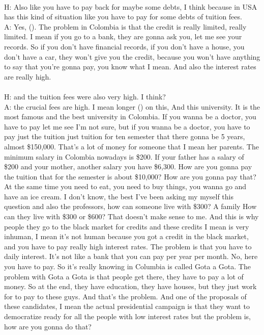 \documentclass{phyasgn}\usepackage{nag}
\begin{document}
\\
H: Also like you have to pay back for maybe some debts, I think because in USA has this kind of situation like you have to pay for some debts of tuition fees.\\
A: Yes, (). The problem in Colombia is that the credit is really limited, really limited. I mean if you go to a bank, they are gonna ask you, let me see your records. So if you don't have financial records, if you don't have a house, you don't have a car, they won't give you the credit, because you won't have anything to say that you're gonna pay, you know what I mean. And also the interest rates are really high.\\
\\
H: and the tuition fees were also very high. I think?\\
A: the crucial fees are high. I mean longer () on this, And this university. It is the most famous and the best university in Colombia. If you wanna be a doctor, you have to pay let me see I'm not sure, but if you wanna be a doctor, you have to pay just the tuition just tuition for ten semester that there gonna be 5 years, almost \$150,000. That's a lot of money for someone that I mean her parents. The minimum salary in Colombia nowadays is \$200. If your father has a salary of \$200 and your mother, another salary you have \$6,300. How are you gonna pay the tuition that for the semester is about \$10,000? How are you gonna pay that? At the same time you need to eat, you need to buy things, you wanna go and have an ice cream. I don't know, the best I've been asking my myself this question and also the professors, how can someone live with \$300? A family How can they live with \$300 or \$600? That doesn't make sense to me. And this is why people they go to the black market for credits and these credits I mean is very inhuman, I mean it's not human because you got a credit in the black market, and you have to pay really high interest rates. The problem is that you have to daily interest. It's not like a bank that you can pay per year per month. No, here you have to pay. So it's really knowing in Columbia is called Gota a Gota. The problem with Gota a Gota is that people get there, they have to pay a lot of money. So at the end, they have education, they have houses, but they just work for to pay to these guys. And that's the problem. And one of the proposals of these candidates, I mean the actual presidential campaign is that they want to democratize ready for all the people with low interest rates but the problem is, how are you gonna do that?\\
\end{document}
